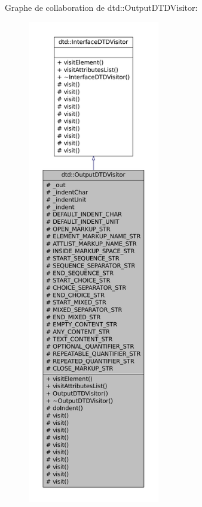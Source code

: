 Graphe de collaboration de dtd::OutputDTDVisitor:\nopagebreak
\begin{figure}[H]
\begin{center}
\leavevmode
\includegraphics[height=600pt]{classdtd_1_1_output_d_t_d_visitor__coll__graph}
\end{center}
\end{figure}
